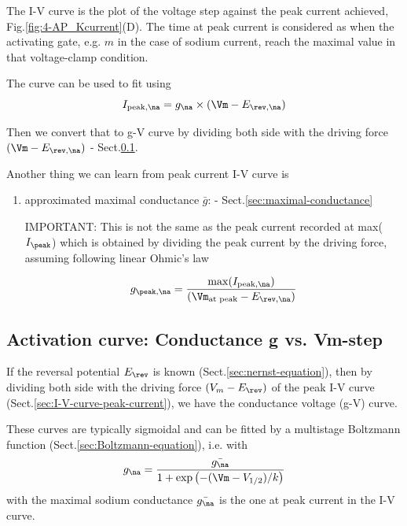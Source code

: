 The I-V curve is the plot of the voltage step against the peak current achieved,
Fig.\ref{fig:4-AP_Kcurrent}(D). The time at peak current is considered as when
the activating gate, e.g. $m$ in the case of sodium current, reach the maximal
value in that voltage-clamp condition.

The curve can be used to fit using
\begin{equation}
I_{\text{peak},\na} = g_{\na} \times (\Vm - E_{\rev,\na})
\end{equation}

Then we convert that to g-V curve by dividing both side with the driving force
$(\Vm - E_{\rev,\na})$ - Sect.\ref{sec:g-Vm-curve}.

Another thing we can learn from peak current I-V curve is
\begin{enumerate}
  \item approximated maximal conductance $\bar{g}$: -
  Sect.\ref{sec:maximal-conductance}

IMPORTANT: This is not the same as the peak current recorded at
max($I_\peak$) which is obtained by dividing the peak current by the driving
force, assuming following linear Ohmic's law

\begin{equation}
g_{\peak,\na} = \frac{\max(I_{\text{peak,\na}})}{(\Vm_\text{at peak} -
E_{\rev,\na})}
\end{equation}
\end{enumerate}


\subsection{Activation curve: Conductance g vs. Vm-step}
\label{sec:g-Vm-curve}
\label{sec:conductance-voltage-curve}

If the reversal potential $E_\rev$ is known (Sect.\ref{sec:nernst-equation}),
then by dividing both side with the driving force $(V_m-E_\rev)$ of the
peak I-V curve (Sect.\ref{sec:I-V-curve-peak-current}), we have
the conductance voltage (g-V) curve.

These curves are typically sigmoidal and can be fitted by a multistage Boltzmann
function (Sect.\ref{sec:Boltzmann-equation}), i.e. with
\begin{equation}
g_\na = \frac{\bar{g_\na}}{1 + \exp\left( -(\Vm - V_{1/2}) / k \right)}
\end{equation}
with the maximal sodium conductance $\bar{g_\na}$ is the one at peak current in
the I-V curve.

